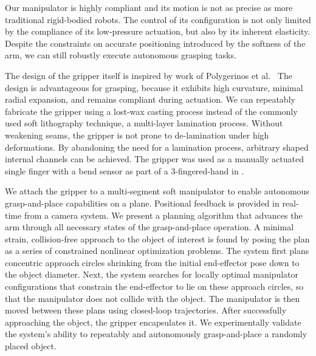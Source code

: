 Our manipulator is highly compliant and its motion is not as precise as more traditional rigid-bodied robots. 
The control of its configuration is not only limited by the compliance of its low-pressure actuation, but also by its inherent elasticity.
Despite the constraints on accurate positioning introduced by the softness of the arm, we can still robustly execute autonomous grasping tasks.


The design of the gripper itself is inspired by work of Polygerinos et al.~\cite{polygerinos2013towards}
The design is advantageous for grasping, because it exhibits high curvature, minimal radial expansion, and remains compliant during actuation. 
We can repeatably fabricate the gripper using a lost-wax casting process instead of the commonly used soft lithography technique, a multi-layer lamination process.
Without weakening seams, the gripper is not prone to de-lamination under high deformations. 
By abandoning the need for a lamination process, arbitrary shaped internal channels can be achieved. 
The gripper was used as a manually actuated single finger with a bend sensor as part of a 3-fingered-hand in \cite{homberg2015haptic}.

We attach the gripper to a multi-segment soft manipulator to enable autonomous grasp-and-place capabilities on a plane. 
Positional feedback is provided in real-time from a camera system.
We present a planning algorithm that advances the arm through all necessary states of the grasp-and-place operation.
A minimal strain, collision-free approach to the object of interest is found by posing the plan as a series of constrained nonlinear optimization problems.
The system first plans concentric approach circles shrinking from the initial end-effector pose down to the object diameter.
Next, the system searches for locally optimal manipulator configurations that constrain the end-effector to lie on these approach circles, so that the manipulator does not collide with the object. 
The manipulator is then moved between these plans using closed-loop trajectories. 
After successfully approaching the object, the gripper encapsulates it.
We experimentally validate the system's ability to repeatably and autonomously grasp-and-place a randomly placed object.


